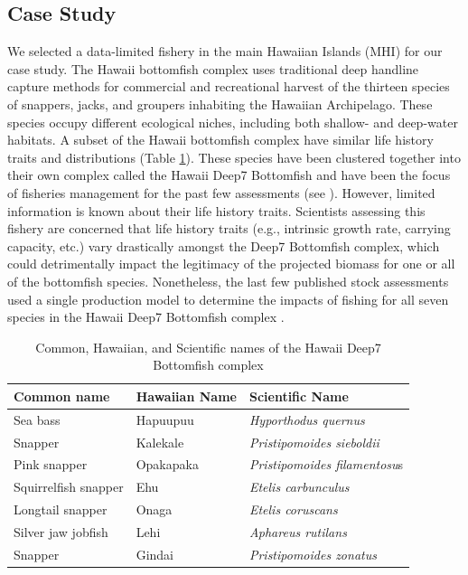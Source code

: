 \documentclass[oneside,12pt,final]{sty/ucthesis-CA2012}
\let\cite\citep                             %
\begin{document}
\begin{mainmatter}
\subsection{Case Study}
We selected a data-limited fishery in the main Hawaiian Islands (MHI) for our case study. The Hawaii bottomfish complex uses traditional deep handline capture methods for commercial and recreational harvest of the thirteen species of snappers, jacks, and groupers inhabiting the Hawaiian Archipelago. These species occupy different ecological niches, including both shallow- and deep-water habitats. A subset of the Hawaii bottomfish complex have similar life history traits and distributions (Table \ref{names}). These species have been clustered together into their own complex called the Hawaii Deep7 Bottomfish and have been the focus of fisheries management for the past few assessments (see \citealt{langseth2018stock}). However, limited information is known about their life history traits. Scientists assessing this fishery are concerned that life history traits (e.g., intrinsic growth rate, carrying capacity, etc.) vary drastically amongst the Deep7 Bottomfish complex, which could detrimentally impact the legitimacy of the projected biomass for one or all of the bottomfish species. Nonetheless, the last few published stock assessments used a single production model to determine the impacts of fishing for all seven species in the Hawaii Deep7 Bottomfish complex  \cite{brodziak2009hawaiian,langseth2018stock}. 

\begin{table}[H]
\centering
\caption{Common, Hawaiian, and Scientific names of the Hawaii Deep7 Bottomfish complex}
\begin{tabular}{lll}
  \hline \small
 Common name & Hawaiian Name & Scientific Name \\ 
   \hline
Sea bass & Hapuupuu & \textit{Hyporthodus quernus} \\
Snapper & Kalekale & \textit{Pristipomoides sieboldii} \\
Pink snapper & Opakapaka & \textit{Pristipomoides filamentosu}s \\
Squirrelfish snapper & Ehu & \textit{Etelis carbunculus} \\
Longtail snapper & Onaga & \textit{Etelis coruscans} \\
Silver jaw jobfish & Lehi & \textit{Aphareus rutilans} \\
Snapper & Gindai & \textit{Pristipomoides zonatus} \\
   \hline
\end{tabular} 
\label{names}
\end{table}


\end{mainmatter}
\end{document}
